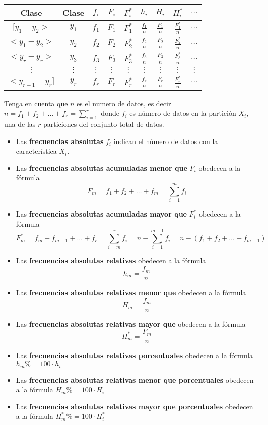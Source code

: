 \documentclass[10pt,]{krantz}
\theoremstyle{definition}
\theoremstyle{definition}
\theoremstyle{definition}
\theoremstyle{remark}
\begin{document}
\begin{longtable}[]{@{}ccccccccc@{}}
\toprule
Clase & Clase & \(f_i\) & \(F_i\) & \(F_i^*\) & \(h_i\) & \(H_i\) & \(H_i^*\) & \(\ldots\)\tabularnewline
\midrule
\endhead
\([y_1-y_2>\) & \(y_1\) & \(f_1\) & \(F_1\) & \(F_1^*\) & \(\frac{f_1}{n}\) & \(\frac{F_1}{n}\) & \(\frac{F_1^*}{n}\) & \(\ldots\)\tabularnewline
\(<y_1-y_2>\) & \(y_2\) & \(f_2\) & \(F_2\) & \(F_2^*\) & \(\frac{f_2}{n}\) & \(\frac{F_2}{n}\) & \(\frac{F_2^*}{n}\) & \(\ldots\)\tabularnewline
\(<y_{r}-y_r>\) & \(y_3\) & \(f_3\) & \(F_3\) & \(F_3^*\) & \(\frac{f_3}{n}\) & \(\frac{F_3}{n}\) & \(\frac{F_3^*}{n}\) & \(\ldots\)\tabularnewline
\(\vdots\) & \(\vdots\) & \(\vdots\) & \(\vdots\) & \(\vdots\) & \(\vdots\) & \(\vdots\) & \(\vdots\) & \(\vdots\)\tabularnewline
\(<y_{r-1}-y_r]\) & \(y_r\) & \(f_r\) & \(F_r\) & \(F_r^*\) & \(\frac{f_r}{n}\) & \(\frac{F_r}{n}\) & \(\frac{F_r^*}{n}\) & \(...\)\tabularnewline
\bottomrule
\end{longtable}

Tenga en cuenta que \(n\) es el numero de datos, es decir \(n=f_1+f_2+\ldots+f_r=\sum_{i=1}^r\) donde \(f_i\) es número de datos en la partición \(X_i\), una de las \(r\) particiones del conjunto total de datos.

\begin{itemize}
\item
  Las \textbf{frecuencias absolutas} \(f_i\) indican el número de datos con la característica \(X_i\).
\item
  Las \textbf{frecuencias absolutas acumuladas menor que} \(F_i\) obedecen a la fórmula
  \[F_m=f_1+f_2+\ldots+f_m=\sum_{i=1}^mf_i\]
\item
  Las \textbf{frecuencias absolutas acumuladas mayor que} \(F_i^*\) obedecen a la fórmula
  \[F_m^*=f_m+f_{m+1}+\ldots+f_r=\sum_{i=m}^rf_i=n-\sum_{i=1}^{m-1}f_i=n-\left(f_1+f_{2}+\ldots+f_{m-1}\right)\]
\item
  Las \textbf{frecuencias absolutas relativas} obedecen a la fórmula
  \[h_m=\frac{f_m}{n}\]
\item
  Las \textbf{frecuencias absolutas relativas menor que} obedecen a la fórmula
  \[H_m=\frac{f_m}{n}\]
\item
  Las \textbf{frecuencias absolutas relativas mayor que} obedecen a la fórmula
  \[H_m^*=\frac{F_m}{n}\]
\item
  Las \textbf{frecuencias absolutas relativas porcentuales} obedecen a la fórmula
  \(h_m\%=100\cdot h_i\)
\item
  Las \textbf{frecuencias absolutas relativas menor que porcentuales} obedecen a la fórmula
  \(H_m\%=100\cdot H_i\)
\item
  Las \textbf{frecuencias absolutas relativas mayor que porcentuales} obedecen a la fórmula
  \(H_m^*\%=100\cdot H_i^*\)
\end{itemize}
\end{document}
